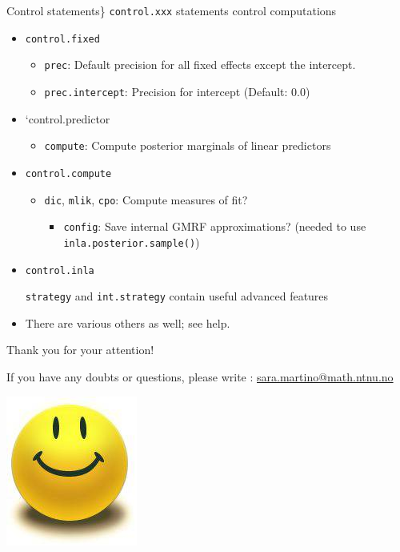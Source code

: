 \documentclass[
  handout]{beamer}
\providecommand{\tightlist}{%
  \setlength{\itemsep}{0pt}\setlength{\parskip}{0pt}}
\begin{document}
\begin{frame}[fragile]{Control statements\}}
\protect\hypertarget{control-statements-1}{}
\texttt{control.xxx} statements control computations

\begin{itemize}
\item
  \texttt{control.fixed}

  \begin{itemize}
  \tightlist
  \item
    \texttt{prec}: Default precision for all fixed effects except the
    intercept.
  \item
    \texttt{prec.intercept}: Precision for intercept (Default: 0.0)
  \end{itemize}
\item
  `control.predictor

  \begin{itemize}
  \tightlist
  \item
    \texttt{compute}: Compute posterior marginals of linear predictors
  \end{itemize}
\item
  \texttt{control.compute}

  \begin{itemize}
  \item
    \texttt{dic}, \texttt{mlik}, \texttt{cpo}: Compute measures of fit?

    \begin{itemize}
    \tightlist
    \item
      \texttt{config}: Save internal GMRF approximations? (needed to use
      \texttt{inla.posterior.sample()})
    \end{itemize}
  \end{itemize}
\item
  \texttt{control.inla}

  \texttt{strategy} and \texttt{int.strategy} contain useful advanced
  features
\item
  There are various others as well; see help.
\end{itemize}
\end{frame}

\begin{frame}{}
\protect\hypertarget{section-10}{}
\Large

Thank you for your attention!

\normalsize

If you have any doubts or questions, please write :
\url{sara.martino@math.ntnu.no}

\begin{center}\includegraphics[width=0.3\linewidth]{graphics/smiley_small} \end{center}
\end{frame}
\end{document}
